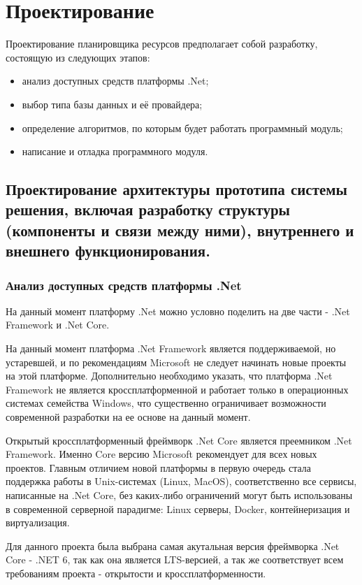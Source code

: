 \section{Проектирование}

Проектирование планировщика ресурсов предполагает собой разработку, состоящую из следующих этапов:
\begin{itemize}
	\item анализ доступных средств платформы .Net;
	\item выбор типа базы данных и её провайдера;
	\item определение алгоритмов, по которым будет работать программный модуль;
	\item написание и отладка программного модуля.
\end{itemize}


\subsection{Проектирование архитектуры прототипа системы решения, включая разработку структуры (компоненты и связи между ними), внутреннего и внешнего функционирования.}

\subsubsection{Анализ доступных средств платформы .Net}

На данный момент платформу .Net можно условно поделить на две части - .Net Framework и .Net Core.

На данный момент платформа .Net Framework является поддерживаемой, но устаревшей, и по рекомендациям Microsoft \cite{microrec} не следует начинать новые проекты на этой платформе. Дополнительно необходимо указать, что платформа .Net Framework не является кроссплатформенной и работает только в операционных системах семейства Windows, что существенно ограничивает возможности современной разработки на ее основе на данный момент.

Открытый кроссплатформенный фреймворк .Net Core является преемником .Net Framework. Именно Core версию Microsoft рекомендует для всех новых проектов. Главным отличием новой платформы в первую очередь стала поддержка работы в Unix-системах (Linux, MacOS), соответственно все сервисы, написанные на .Net Core, без каких-либо ограничений могут быть использованы в современной серверной парадигме: Linux серверы, Docker, контейнеризация и виртуализация.

Для данного проекта была выбрана самая акутальная версия фреймворка .Net Core - .NET 6, так как она является LTS-версией, а так же соответствует всем требованиям проекта - открытости и кроссплатформенности.


